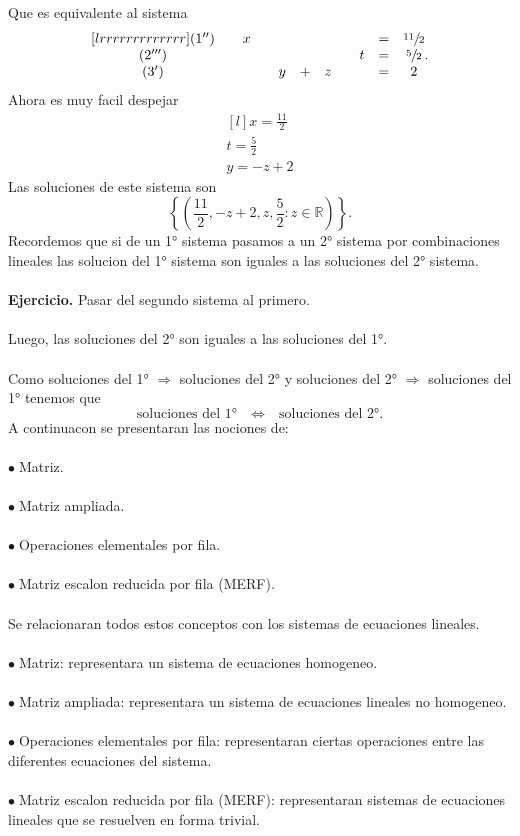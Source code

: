 \documentclass{article}
\theoremstyle{definition}
\theoremstyle{definition}
\theoremstyle{remark}
\newcommand\bl{$\bullet\;$}
\begin{document}
Que es equivalente al sistema
\[
  \begin{matrix}[lrrrrrrrrrrrrr]
    (1'') \quad &  x &  &  &  &  &  &  & = & \sfrac{11}{2} \\
    (2''') \quad &  & &  &  &  &  & t & = & \sfrac{5}{2} \\
    (3') \quad &  &  & y & + & z &  &  & = & 2 \\
   \end{matrix}.
\]
Ahora es muy facil despejar
\[
  \begin{matrix}[l]
    x=\frac{11}{2}\\
    t=\frac{5}{2}\\
    y=-z+2
  \end{matrix}
\]
Las soluciones de este sistema son \[
  \left\{\left(\frac{11}{2},-z+2,z,\frac{5}{2} : z \in \mathbb{R}\right)\right\}.
\]
Recordemos que si de un 1° sistema pasamos a un 2° sistema por combinaciones lineales las solucion del 1° sistema son iguales a las soluciones del 2° sistema.\\\\
\textbf{Ejercicio.} Pasar del segundo sistema al primero.\\\\
Luego, las soluciones del 2° son iguales a las soluciones del 1°. \\\\
Como soluciones del 1° $\Rightarrow$ soluciones del 2° y soluciones del 2° $\Rightarrow$ soluciones del 1° tenemos que \[
  \text{soluciones del 1°} \quad \Leftrightarrow \quad \text{soluciones del 2°.}
\]
A continuacon se presentaran las nociones de: \\\\
\quad \bl Matriz.\\\\
\quad \bl Matriz ampliada. \\\\
\quad \bl Operaciones elementales por fila.\\\\
\quad \bl Matriz escalon reducida por fila (MERF).\\\\
Se relacionaran todos estos conceptos con los sistemas de ecuaciones lineales.\\\\
\quad \bl Matriz: representara un sistema de ecuaciones homogeneo.\\\\
\quad \bl Matriz ampliada: representara un sistema de ecuaciones lineales no homogeneo.\\\\
\quad \bl Operaciones elementales por fila: representaran ciertas operaciones entre las diferentes ecuaciones del sistema.\\\\
\quad \bl Matriz escalon reducida por fila (MERF): representaran sistemas de ecuaciones lineales que se resuelven en forma trivial.
\pagebreak
\end{document}
